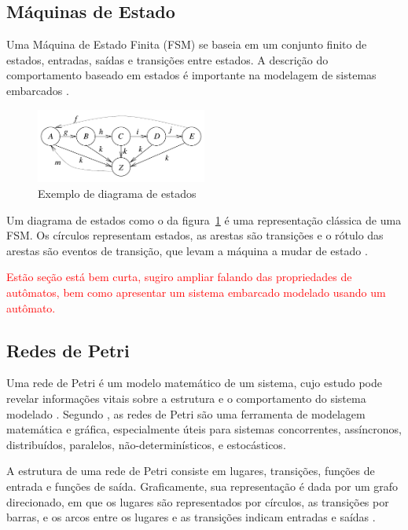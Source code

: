 \subsection{Máquinas de Estado}


Uma Máquina de Estado Finita (FSM) se baseia em um conjunto finito de estados, entradas, saídas e transições entre estados. A descrição do comportamento baseado em estados é importante na modelagem de sistemas embarcados \cite{marwedel:2010}.

\begin{figure}[ht]
	\caption{\label{fig:fsm}Exemplo de diagrama de estados}
	\begin{center}
	    \includegraphics[width=0.5\textwidth]{resources/fsm_marwedel}
	\end{center}
\end{figure}

Um diagrama de estados como o da figura~\ref{fig:fsm} é uma representação clássica de uma FSM. Os círculos representam estados, as arestas são transições e o rótulo das arestas são eventos de transição, que levam a máquina a mudar de estado \cite{marwedel:2010}.

\textcolor{red}{Estão seção está bem curta, sugiro ampliar falando das propriedades de autômatos, bem como apresentar um sistema embarcado modelado usando um autômato.}

\subsection{Redes de Petri}
Uma rede de Petri é um modelo matemático de um sistema, cujo estudo pode revelar informações vitais sobre a estrutura e o comportamento do sistema modelado \cite{peterson:1981}. Segundo , as redes de Petri são uma ferramenta de modelagem matemática e gráfica, especialmente úteis para sistemas concorrentes, assíncronos, distribuídos, paralelos, não-determinísticos, e estocásticos.

A estrutura de uma rede de Petri consiste em lugares, transições, funções de entrada e funções de saída. Graficamente, sua representação é dada por um grafo direcionado, em que os lugares são representados por círculos, as transições por barras, e os arcos entre os lugares e as transições indicam entradas e saídas \cite{peterson:1981}. %

